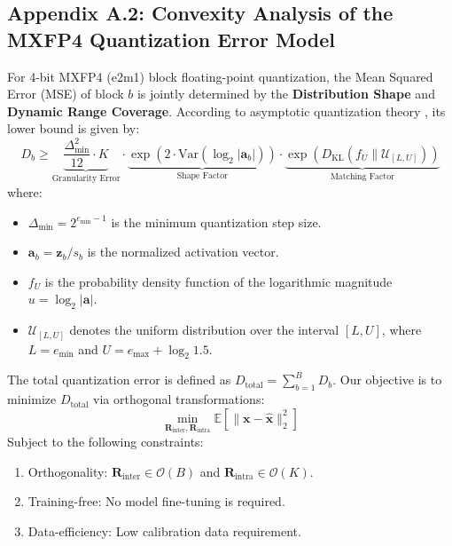 \subsection*{Appendix A.2: Convexity Analysis of the MXFP4 Quantization Error Model}
\label{app:convexity_analysis}

For 4-bit MXFP4 (e2m1) block floating-point quantization, the Mean Squared Error (MSE) of block $b$ is jointly determined by the \textbf{Distribution Shape} and \textbf{Dynamic Range Coverage}. According to asymptotic quantization theory \cite{zamir}, its lower bound is given by:
\begin{equation}
D_b \geq \underbrace{\frac{\Delta_{\min}^2}{12} \cdot K}_{\text{Granularity Error}} \cdot \underbrace{\exp\left( 2 \cdot \mathrm{Var}(\log_2 |\mathbf{a}_b|) \right)}_{\text{Shape Factor}} \cdot \underbrace{\exp\left( D_{\text{KL}}(f_U \| \mathcal{U}_{[L,U]}) \right)}_{\text{Matching Factor}}
\end{equation}
where:
\begin{itemize}
    \item $\Delta_{\min} = 2^{e_{\min}-1}$ is the minimum quantization step size.
    \item $\mathbf{a}_b = \mathbf{z}_b / s_b$ is the normalized activation vector.
    \item $f_U$ is the probability density function of the logarithmic magnitude $u = \log_2 |\mathbf{a}|$.
    \item $\mathcal{U}_{[L,U]}$ denotes the uniform distribution over the interval $[L, U]$, where $L=e_{\min}$ and $U=e_{\max} + \log_2 1.5$.
\end{itemize}

The total quantization error is defined as $D_{\text{total}} = \sum_{b=1}^B D_b$. Our objective is to minimize $D_{\text{total}}$ via orthogonal transformations:
\begin{equation}
\min_{\mathbf{R}_{\text{inter}}, \mathbf{R}_{\text{intra}}} \mathbb{E}\left[ \|\mathbf{x} - \hat{\mathbf{x}}\|_2^2 \right]
\end{equation}
Subject to the following constraints:
\begin{enumerate}
    \item Orthogonality: $\mathbf{R}_{\text{inter}} \in \mathcal{O}(B)$ and $\mathbf{R}_{\text{intra}} \in \mathcal{O}(K)$.
    \item Training-free: No model fine-tuning is required.
    \item Data-efficiency: Low calibration data requirement.
\end{enumerate}